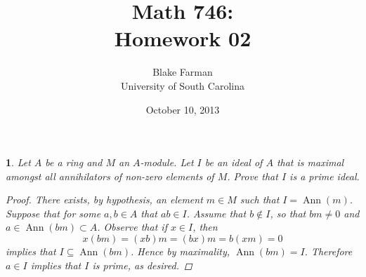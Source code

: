 \documentclass[10pt]{amsart}
\author{Blake Farman\\University of South Carolina}
\title{Math 746:\\Homework 02}
\date{October 10, 2013}
\begin{document}
\maketitle

\providecommand{\p}{\mathfrak{p}}
\providecommand{\m}{\mathfrak{m}}
\providecommand{\Ann}[1]{\operatorname{Ann}\left(#1\right)}
\newtheorem{thm}{}
\newtheorem{lem}{Lemma}

\begin{thm}
	Let $A$ be a ring and $M$ an $A$-module.
	Let $I$ be an ideal of $A$ that is maximal amongst all annihilators of non-zero elements of $M$.
	Prove that $I$ is a prime ideal.

\begin{proof}
	There exists, by hypothesis, an element $m \in M$ such that $I = \Ann{m}$.
	Suppose that for some $a, b \in A$ that $ab \in I$.
	Assume that $b \not \in I$, so that $bm \neq 0$ and $a \in \Ann{bm} \subset A$.
	Observe that if $x \in I$, then
		$$x(bm) = (xb)m = (bx)m = b(xm) = 0$$
	implies that $I \subseteq \Ann{bm}$.
	Hence by maximality, $\Ann{bm} = I$.
	Therefore $a \in I$ implies that $I$ is prime, as desired.
\end{proof}
\end{thm}
\end{document}
